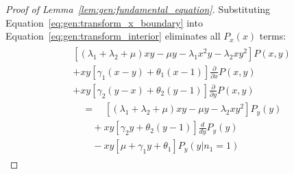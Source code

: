 \begin{proof}[Proof of Lemma~\ref{lem:gen:fundamental_equation}]
    Substituting Equation~\eqref{eq:gen:transform_x_boundary} into Equation~\eqref{eq:gen:transform_interior} eliminates all $P_x(x)$ terms:
    \begin{align}
        \begin{split}
            & \left[ (\lambda_1+\lambda_2+\mu)xy - \mu y - \lambda_1 x^2 y - \lambda_2 x y^2 \right] P(x,y) \\
            & + xy \left[ \gamma_1(x-y) + \theta_1(x-1) \right] \frac{\partial}{\partial x} P(x,y) \\
            & + xy \left[ \gamma_2(y-x) + \theta_2(y-1) \right] \frac{\partial}{\partial y} P(x,y) \\
            & \quad = \quad \left[ (\lambda_1 + \lambda_2 + \mu)xy - \mu y - \lambda_2 x y^2 \right] P_y(y) \\
            & \quad \quad + xy \left[ \gamma_2 y + \theta_2(y-1) \right] \frac{d}{dy} P_y(y) \\
            & \quad \quad - xy \left[ \mu + \gamma_1 y + \theta_1 \right] P_y(y | n_1=1)
        \end{split} \label{eq:gen:plugged_interior_x}
    \end{align}
    

\end{proof}
